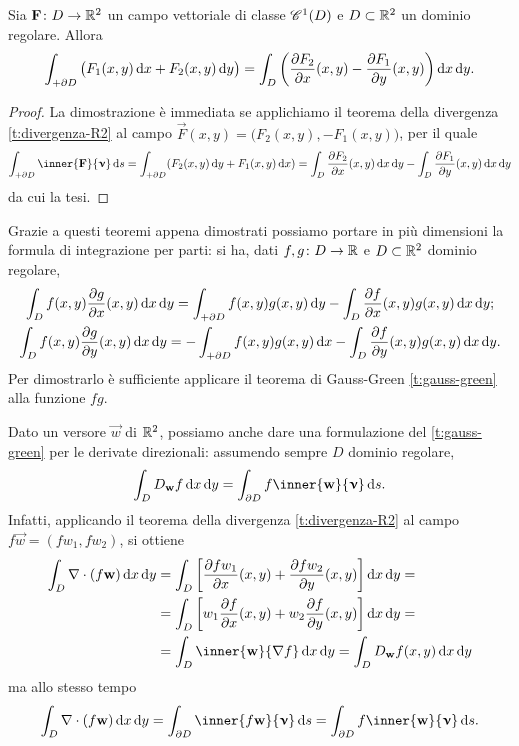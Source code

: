 \begin{teorema} \label{t:rotore-R2}
	Sia $\vec F\colon D\to\R^2$ un campo vettoriale di classe $\cont[1]{D}$ e $D\subset\R^2$ un dominio regolare.
	Allora
	\begin{equation}
		\int_{+\boundary D}\big(F_1(x,y)\,\dd x+F_2(x,y)\,\dd y\big)=\int_D\bigg(\drp{F_2}{x}(x,y)-\drp{F_1}{y}(x,y)\bigg)\,\dd x\,\dd y.
		\label{eq:rotore-R2}
	\end{equation}
\end{teorema}
\begin{proof}
	La dimostrazione è immediata se applichiamo il teorema della divergenza \ref{t:divergenza-R2} al campo $\vec F(x,y)=\big(F_2(x,y),-F_1(x,y)\big)$, per il quale
	\begin{equation}
		\int_{+\boundary D}\inner{\vec F}{\vnu}\,\dd s=\int_{+\boundary D}(F_2(x,y)\,\dd y+F_1(x,y)\,\dd x)=\int_D\drp{F_2}{x}(x,y)\,\dd x\,\dd y-\int_D\drp{F_1}{y}(x,y)\,\dd x\,\dd y
	\end{equation}
	da cui la tesi.
\end{proof}
Grazie a questi teoremi appena dimostrati possiamo portare in più dimensioni la formula di integrazione per parti: si ha, dati $f,g\colon D\to\R$ e $D\subset\R^2$ dominio regolare,
\begin{gather}
	\int_D f(x,y)\drp{g}{x}(x,y)\,\dd x\,\dd y=\int_{+\boundary D}f(x,y)g(x,y)\,\dd y-\int_D\drp{f}{x}(x,y)g(x,y)\,\dd x\,\dd y;\\
	\int_D f(x,y)\drp{g}{y}(x,y)\,\dd x\,\dd y=-\int_{+\boundary D}f(x,y)g(x,y)\,\dd x-\int_D\drp{f}{y}(x,y)g(x,y)\,\dd x\,\dd y.
\end{gather}
Per dimostrarlo è sufficiente applicare il teorema di Gauss-Green \ref{t:gauss-green} alla funzione $fg$.

Dato un versore $\vec w$ di $\R^2$, possiamo anche dare una formulazione del \ref{t:gauss-green} per le derivate direzionali: assumendo sempre $D$ dominio regolare,
\begin{equation}
	\int_DD_{\vec w}f\,\dd x\,\dd y=\int_{\boundary D}f\inner{\vec w}{\vnu}\,\dd s.
\end{equation}
Infatti, applicando il teorema della divergenza \ref{t:divergenza-R2} al campo $f\vec w=(fw_1,fw_2)$, si ottiene
\begin{equation}
	\begin{split}
		\int_D\div(f\vec w)\,\dd x\,\dd y&=\int_D\bigg[\drp{fw_1}{x}(x,y)+\drp{fw_2}{y}(x,y)\bigg]\,\dd x\,\dd y=\\
		&=\int_D\bigg[w_1\drp{f}{x}(x,y)+w_2\drp{f}{y}(x,y)\bigg]\,\dd x\,\dd y=\\
		&=\int_D\inner{\vec w}{\grad f}\,\dd x\,\dd y=\int_DD_{\vec w}f(x,y)\,\dd x\,\dd y
	\end{split}
\end{equation}
ma allo stesso tempo
\begin{equation}
	\int_D\div(f\vec w)\,\dd x\,\dd y=\int_{\boundary D}\inner{f\vec w}{\vnu}\,\dd s=\int_{\boundary D}f\inner{\vec w}{\vnu}\,\dd s.
\end{equation}

